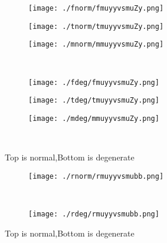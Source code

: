\documentclass[aps,floats,floatfix,nofootinbib]{revtex4-1}
\begin{document}
\begin{center}
\begin{figure}
\begin{subfigure}{0.3\textwidth}
\texttt{[image: ./fnorm/fmuyyvsmuZy.png]}
\label{}
\end{subfigure}
\begin{subfigure}{0.3\textwidth}
\texttt{[image: ./tnorm/tmuyyvsmuZy.png]}
\label{}
\end{subfigure}
\begin{subfigure}{0.3\textwidth}
\texttt{[image: ./mnorm/mmuyyvsmuZy.png]}
\label{}
\end{subfigure}\\
\begin{subfigure}{0.3\textwidth}
\texttt{[image: ./fdeg/fmuyyvsmuZy.png]}
\label{}
\end{subfigure}
\begin{subfigure}{0.3\textwidth}
\texttt{[image: ./tdeg/tmuyyvsmuZy.png]}
\label{}
\end{subfigure}
\begin{subfigure}{0.3\textwidth}
\texttt{[image: ./mdeg/mmuyyvsmuZy.png]}
\label{}
\end{subfigure}\\
\caption{Top is normal,Bottom is degenerate}
\end{figure}
\end{center}

\begin{center}
\begin{figure}
\begin{subfigure}{0.95\textwidth}
\texttt{[image: ./rnorm/rmuyyvsmubb.png]}
\label{}
\end{subfigure}\\
\begin{subfigure}{0.95\textwidth}
\texttt{[image: ./rdeg/rmuyyvsmubb.png]}
\label{}
\end{subfigure}
\caption{Top is normal,Bottom is degenerate}
\end{figure}
\end{center}
\end{document}
